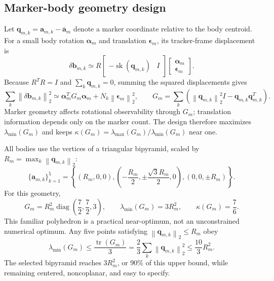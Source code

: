 \documentclass[11pt]{article}
\newcommand{\vct}[1]{\bm{#1}}
\newcommand{\sk}{\operatorname{sk}}
\newcommand{\diag}{\operatorname{diag}}
\newcommand{\tr}{\operatorname{tr}}
\newcommand{\norm}[1]{\left\|#1\right\|_2}
\begin{document}
\subsection{Marker-body geometry design}
Let $\vct q_{m,k}=\vct a_{m,k}-\overline{\vct a}_m$ denote a marker
coordinate relative to the body centroid.  For a small body rotation
$\vct\alpha_m$ and translation $\vct\epsilon_m$, its tracker-frame displacement
is
\begin{equation}
\delta\vct b_{m,k}
\simeq R
\begin{bmatrix}-\sk(\vct q_{m,k})&I\end{bmatrix}
\begin{bmatrix}\vct\alpha_m\\\vct\epsilon_m\end{bmatrix}.
\end{equation}
Because $R^TR=I$ and $\sum_k\vct q_{m,k}=0$, summing the squared displacements
gives
\begin{equation}
\sum_k\norm{\delta\vct b_{m,k}}^2
\simeq
\vct\alpha_m^TG_m\vct\alpha_m
+N_k\norm{\vct\epsilon_m}^2,
\qquad
G_m=\sum_k\left(\norm{\vct q_{m,k}}^2I
-\vct q_{m,k}\vct q_{m,k}^T\right).
\label{eq:marker-information}
\end{equation}
Marker geometry affects rotational observability through $G_m$; translation
information depends only on the marker count.  The design therefore maximizes
$\lambda_{\min}(G_m)$ and keeps
$\kappa(G_m)=\lambda_{\max}(G_m)/\lambda_{\min}(G_m)$ near one.

All bodies use the vertices of a triangular bipyramid, scaled by
$R_m=\max_k\norm{\vct q_{m,k}}$:
\begin{equation}
\boxed{
\{\vct a_{m,k}\}_{k=1}^{5}
=\left\{
(R_m,0,0),
\left(-\frac{R_m}{2},\pm\frac{\sqrt3R_m}{2},0\right),
(0,0,\pm R_m)
\right\}.}
\label{eq:triangular-bipyramid}
\end{equation}
For this geometry,
\begin{equation}
G_m=R_m^2\diag\!\left(\frac72,\frac72,3\right),
\qquad
\lambda_{\min}(G_m)=3R_m^2,
\qquad
\kappa(G_m)=\frac76.
\label{eq:bipyramid-information}
\end{equation}
This familiar polyhedron is a practical near-optimum, not an unconstrained
numerical optimum.  Any five points satisfying
$\norm{\vct q_{m,k}}\leq R_m$ obey
\begin{equation}
\lambda_{\min}(G_m)
\leq\frac{\tr(G_m)}{3}
=\frac{2}{3}\sum_k\norm{\vct q_{m,k}}^2
\leq\frac{10}{3}R_m^2.
\end{equation}
The selected bipyramid reaches $3R_m^2$, or $90\%$ of this upper bound, while
remaining centered, noncoplanar, and easy to specify.
\end{document}
